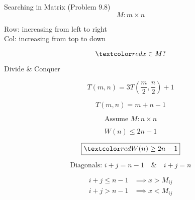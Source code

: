 
\begin{frame}{}
  \begin{exampleblock}{Searching in Matrix (Problem $9.8$)}
    \[
      M: m \times n
    \]

    \begin{center}
      {Row: increasing from left to right} \\[6pt]
      {Col: increasing from top to down}
    \end{center}

    \vspace{-0.50cm}
    \[
      \red{x \in M?}
    \]
  \end{exampleblock}

  \pause
  \vspace{0.30cm}
  \centerline{Divide \& Conquer}

  \pause
  \[
    T(m,n) = 3T(\frac{m}{2}, \frac{n}{2}) + 1 
  \]


  \pause
  \vspace{0.30cm}
  \centerline{}

  \pause
  \[
    T(m, n) = m + n - 1
  \]
\end{frame}

\begin{frame}{}
  \[
    \text{Assume } M: n \times n 
  \]

  \[
    W(n) \le 2n - 1
  \]

  \pause
  \[
    \boxed{\red{W(n) \ge 2n - 1}}
  \]

  \pause
  \centerline{}

  \pause
  \[
    \text{Diagonals: } i + j = n - 1 \quad\&\quad i + j = n
  \]

  \pause
  \centerline{}

  \pause
  \begin{align*}
    i + j \le n - 1 &\implies x > M_{ij} \\
    i + j > n - 1 &\implies x < M_{ij} \\
  \end{align*}
\end{frame}
